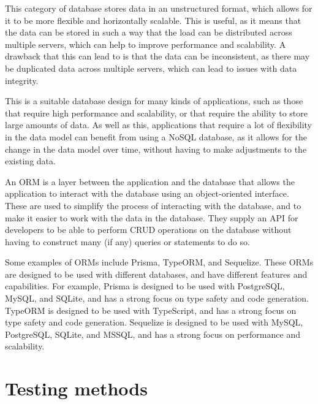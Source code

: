 \documentclass[11pt, a4paper,twoside]{report}
\theoremstyle{plain} %
\theoremstyle{definition} %
\numberwithin{equation}{chapter}
\begin{document}
\begin{description}
{        This category of database stores data in an unstructured format, which
        allows for it to be more flexible and horizontally scalable. This
        is useful, as it means that the data can be stored in such a way that
        the load can be distributed across multiple servers, which can help to
        improve performance and scalability. A drawback that this can lead to
        is that the data can be inconsistent, as there may be duplicated data
        across multiple servers, which can lead to issues with data integrity.

        This is a suitable database design for many kinds of applications, such
        as those that require high performance and scalability, or that require
        the ability to store large amounts of data. As well as this,
        applications that require a lot of flexibility in the data model can
        benefit from using a NoSQL database, as it allows for the change in the
        data model over time, without having to make adjustments to the existing
        data.
        }

\end{description}

An ORM is a layer between the application and the database that allows the
application to interact with the database using an object-oriented interface.
These are used to simplify the process of interacting with the database, and
to make it easier to work with the data in the database. They supply an API for
developers to be able to perform CRUD operations on the database without having
to construct many (if any) queries or statements to do so.

Some examples of ORMs include Prisma, TypeORM, and Sequelize. These ORMs are
designed to be used with different databases, and have different features and
capabilities. For example, Prisma is designed to be used with PostgreSQL,
MySQL, and SQLite, and has a strong focus on type safety and code generation.
TypeORM is designed to be used with TypeScript, and has a strong focus on type
safety and code generation. Sequelize is designed to be used with MySQL,
PostgreSQL, SQLite, and MSSQL, and has a strong focus on performance and
scalability.\cite{orms}

\section{Testing methods}\label{sec:testingmethods}
\end{document}
